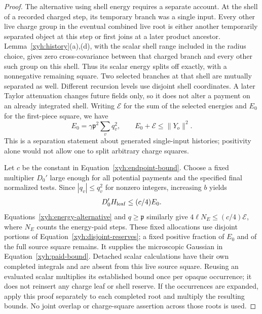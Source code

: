 \begin{proof}
The alternative using shell energy requires a separate account. At the
shell of a recorded charged step, its temporary branch was a single
input. Every other live charge group in the eventual combined live root
is either another temporarily separated object at this step or first
joins at a later product ancestor. Lemma~\ref{xyh:history}(a),(d), with
the scalar shell range included in the radius choice, gives zero
cross-covariance between that charged branch and every other such group
on this shell. Thus its scalar energy splits off exactly, with a
nonnegative remaining square. Two selected branches at that shell are
mutually separated as well. Different recursion levels use disjoint
shell coordinates. A later Taylor attenuation changes future fields
only, so it does not alter a payment on an already integrated shell.
Writing $\mathcal E$ for the sum of the selected energies and $E_0$ for
the first-piece square, we have
\begin{equation}\label{xyh:disjoint-reserves}
 E_0=\gamma\mathfrak p^2\sum_vq_v^2,
 \qquad E_0+\mathcal E\le\|Y_o\|^2.
\end{equation}
This is a separation statement about generated single-input histories;
positivity alone would not allow one to split arbitrary charge squares.

Let $c$ be the constant in Equation~\eqref{xyh:endpoint-bound}. Choose a
fixed multiplier $D_0'$ large enough for all potential payments and the
specified final normalized tests. Since $|q_v|\le q_v^2$ for nonzero
integers, increasing $b$ yields
\[
 D_0'H_{\rm leaf}\le(c/4)E_0.
\]
Equations~\eqref{xyh:energy-alternative} and $q\ge\mathfrak p$ similarly
give $4\ell N_E\le(c/4)\mathcal E$, where $N_E$ counts the energy-paid
steps. These fixed allocations use disjoint portions of
Equation~\eqref{xyh:disjoint-reserves}; a fixed positive fraction of
$E_0$ and of the full source square remains. It supplies the microscopic
Gaussian in Equation~\eqref{xyh:paid-bound}. Detached scalar calculations
have their own completed integrals and are absent from this live source
square. Reusing an evaluated scalar multiplies its established bound once
per opaque occurrence; it does not reinsert any charge leaf or shell
reserve. If the occurrences are expanded, apply this proof separately to
each completed root and multiply the resulting bounds. No joint overlap
or charge-square assertion across those roots is used.
\end{proof}

